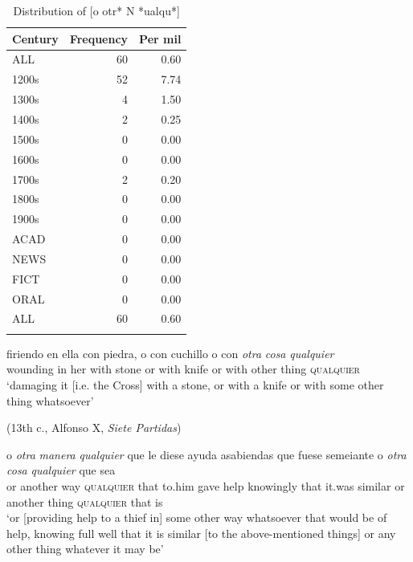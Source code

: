 \begin{table}
\begin{tabular}{lrr}
    \lsptoprule
    {Century} & {Frequency} & {Per mil} \\
    \midrule
    {ALL} & 60 & 0.60 \\
    {1200s} & 52 & 7.74 \\
    {1300s} & 4 & 1.50 \\
    {1400s} & 2 & 0.25 \\
    {1500s} & 0 & 0.00 \\
    {1600s} & 0 & 0.00 \\
    {1700s} & 2 & 0.20 \\
    {1800s} & 0 & 0.00 \\
    {1900s} & 0 & 0.00 \\
    \midrule
    {ACAD} & 0 & 0.00 \\
    {NEWS} & 0 & 0.00 \\
    {FICT} & 0 & 0.00 \\
    {ORAL} & 0 & 0.00 \\
    \midrule
    {ALL} & 60 & 0.60 \\
    \lspbottomrule
\end{tabular}
\caption{\label{tab:distribution2} Distribution of [o otr* N *ualqu*]}
\end{table}


\ea \label{ex:key:292}
\ea \label{ex:key:292-1} 
\gll firiendo en ella con piedra, o con cuchillo o con \textit{otra} \textit{cosa} \textit{qualquier}\\
wounding in her with stone or with knife or with other thing \textsc{qualquier}\\
    \glt ‘damaging it [i.e. the Cross] with a stone, or with a knife or with some other thing whatsoever’

    (13th c., Alfonso X, \textit{Siete Partidas})
    
\ex \label{ex:key:292-2} 
\gll o \textit{otra} \textit{manera} \textit{qualquier} que le diese ayuda asabiendas que fuese semeiante o \textit{otra} \textit{cosa} \textit{qualquier} que sea\\
or another way \textsc{qualquier} that to.him gave help knowingly that it.was similar or another thing \textsc{qualquier} that is\\
    \glt ‘or [providing help to a thief in] some other way whatsoever that would be of help, knowing full well that it is similar [to the above-mentioned things] or any other thing whatever it may be’

